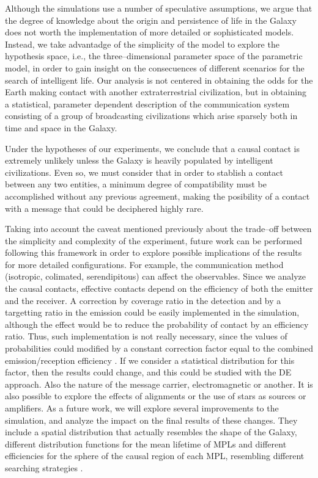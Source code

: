 \documentclass[crop]{CSLB}
\begin{document}
Although the simulations use a number of speculative assumptions, we
argue that the degree of knowledge about the origin and persistence of
life in the Galaxy does not worth the implementation of more detailed
or sophisticated models.
%
Instead, we take advantadge of the simplicity of the model to explore
the hypothesis space, i.e., the three--dimensional parameter space of
the parametric model, in order to gain insight on the consecuences of
different scenarios for the search of intelligent life.
%
Our analysis is not centered in obtaining the odds for the Earth
making contact with another extraterrestrial civilization, but in
obtaining a statistical, parameter dependent description of the
communication system consisting of a group of broadcasting
civilizations which arise sparsely both in time and space in the
Galaxy.



Under the hypotheses of our experiments, we conclude that a causal
contact is extremely unlikely unless the Galaxy is heavily populated
by intelligent civilizations.
%
Even so, we must consider that in order to stablish a contact between
any two entities, a minimum degree of compatibility must be
accomplished without any previous agreement, making the posibility of
a contact with a message that could be deciphered highly rare.



Taking into account the caveat mentioned previously about the
trade--off between the simplicity and complexity of the experiment,
future work can be performed following this framework in order to
explore possible implications of the results for more detailed
configurations.
%
For example, the communication method (isotropic, colimated,
serendipitous) can affect the observables.
%
Since we analyze the causal contacts, effective contacts depend on the
efficiency of both the emitter and the receiver.
%
A correction by coverage ratio in the detection and by a targetting
ratio in the emission could be easily implemented in the simulation,
although the effect would be to reduce the probability of contact by
an efficiency ratio.
%
Thus, such implementation is not really necessary, since the values of
probabilities could modified by a constant correction factor equal to
the combined emission/reception efficiency
\citep{smith_broadcasting_2009, anchordoqui_upper_2019,
forgan_collimated_2014}.
%
If we consider a statistical distribution for this factor, then the
results could change, and this could be studied with the DE approach.
%
Also the nature of the message carrier, electromagnetic or another.
%
It is also possible to explore the effects of alignments or the use of
stars as sources or amplifiers.
%
%
As a future work, we will explore several improvements to the
simulation, and analyze the impact on the final results of these
changes.
%
They include a spatial distribution that actually resembles the shape
of the Galaxy, different distribution functions for the mean lifetime
of MPLs and different efficiencies for the sphere of the causal region
of each MPL, resembling different searching strategies
\citep{hippke_interstellar_2017}.
\end{document}
